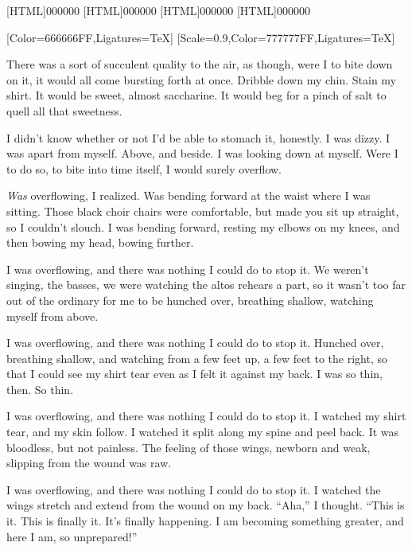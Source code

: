 [HTML]{000000}
[HTML]{000000}
[HTML]{000000}
[HTML]{000000}
\begin{paracol}{2}
[Color=666666FF,Ligatures=TeX]
\renewfontfamily{}[Scale=0.9,Color=777777FF,Ligatures=TeX]
\begin{leftcolumn}
\noindent There was a sort of succulent quality to the air, as though, were I to bite down on it, it would all come bursting forth at once. Dribble down my chin. Stain my shirt. It would be sweet, almost saccharine. It would beg for a pinch of salt to quell all that sweetness.

I didn't know whether or not I'd be able to stomach it, honestly. I was dizzy. I was apart from myself. Above, and beside. I was looking down at myself. Were I to do so, to bite into time itself, I would surely overflow.

\emph{Was} overflowing, I realized. Was bending forward at the waist where I was sitting. Those black choir chairs were comfortable, but made you sit up straight, so I couldn't slouch. I was bending forward, resting my elbows on my knees, and then bowing my head, bowing further.

I was overflowing, and there was nothing I could do to stop it. We weren't singing, the basses, we were watching the altos rehears a part, so it wasn't too far out of the ordinary for me to be hunched over, breathing shallow, watching myself from above.

I was overflowing, and there was nothing I could do to stop it. Hunched over, breathing shallow, and watching from a few feet up, a few feet to the right, so that I could see my shirt tear even as I felt it against my back. I was so thin, then. So thin.

I was overflowing, and there was nothing I could do to stop it. I watched my shirt tear, and my skin follow. I watched it split along my spine and peel back. It was bloodless, but not painless. The feeling of those wings, newborn and weak, slipping from the wound was raw.

I was overflowing, and there was nothing I could do to stop it. I watched the wings stretch and extend from the wound on my back. ``Aha,'' I thought. ``This is it. This is finally it. It's finally happening. I am becoming something greater, and here I am, so unprepared!''


\end{leftcolumn}
\end{paracol}
